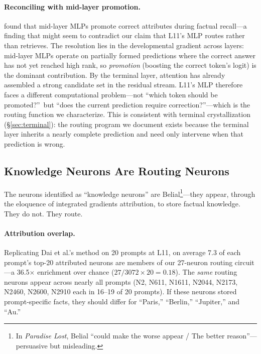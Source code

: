 \documentclass{article}
\begin{document}
\paragraph{Reconciling with mid-layer promotion.}
\citet{geva2023dissecting} found that mid-layer MLPs promote correct attributes
during factual recall---a finding that might seem to contradict our claim that
L11's MLP routes rather than retrieves.
The resolution lies in the developmental gradient across layers:
mid-layer MLPs operate on partially formed predictions where the correct
answer has not yet reached high rank, so \emph{promotion} (boosting the
correct token's logit) is the dominant contribution.
By the terminal layer, attention has already assembled a strong candidate
set in the residual stream.
L11's MLP therefore faces a different computational problem---not ``which
token should be promoted?''\ but ``does the current prediction require
correction?''---which is the routing function we characterize.
This is consistent with terminal crystallization (\S\ref{sec:terminal}):
the routing program we document exists because the terminal layer inherits
a nearly complete prediction and need only intervene when that prediction
is wrong.

\subsection{Knowledge Neurons Are Routing Neurons}
\label{sec:knowledge_neurons}

The neurons \citet{dai2022knowledge} identified as ``knowledge neurons'' are
Belial\footnote{In \emph{Paradise Lost}, Belial ``could make the worse appear /
The better reason''---persuasive but misleading.}---they appear, through the
eloquence of integrated gradients attribution, to store factual knowledge.
They do not. They route.

\paragraph{Attribution overlap.}
Replicating Dai et al.'s method on 20 prompts at L11, on average 7.3 of
each prompt's top-20 attributed neurons are members of our 27-neuron routing
circuit---a 36.5$\times$ enrichment over chance ($27/3072 \times 20 = 0.18$).
The \emph{same} routing neurons appear across nearly all prompts (N2, N611,
N1611, N2044, N2173, N2460, N2600, N2910 each in 16--19 of 20 prompts).
If these neurons stored prompt-specific facts, they should differ for
``Paris,'' ``Berlin,'' ``Jupiter,'' and ``Au.''
\end{document}
